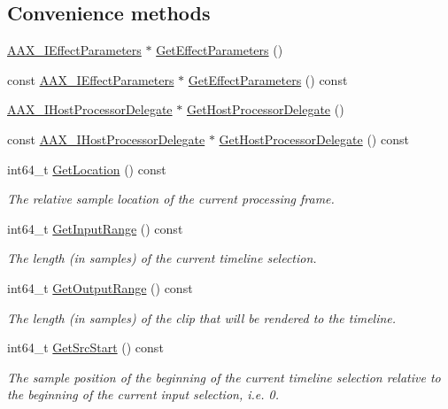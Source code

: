 \subsection*{Convenience methods}
\begin{DoxyCompactItemize}
\item 
\mbox{\hyperlink{a01825}{A\+A\+X\+\_\+\+I\+Effect\+Parameters}} $\ast$ \mbox{\hyperlink{a01485_ac545926ac56fe6788aebda2a905a138f}{Get\+Effect\+Parameters}} ()
\item 
const \mbox{\hyperlink{a01825}{A\+A\+X\+\_\+\+I\+Effect\+Parameters}} $\ast$ \mbox{\hyperlink{a01485_aee036e76c1dd18a874f9327fb3d5d629}{Get\+Effect\+Parameters}} () const
\item 
\mbox{\hyperlink{a01837}{A\+A\+X\+\_\+\+I\+Host\+Processor\+Delegate}} $\ast$ \mbox{\hyperlink{a01485_aff1d956c341d1e06283a1bbb91240ebd}{Get\+Host\+Processor\+Delegate}} ()
\item 
const \mbox{\hyperlink{a01837}{A\+A\+X\+\_\+\+I\+Host\+Processor\+Delegate}} $\ast$ \mbox{\hyperlink{a01485_ab008fdeaecb5d282a0f5bc4166d25dd8}{Get\+Host\+Processor\+Delegate}} () const
\item 
int64\+\_\+t \mbox{\hyperlink{a01485_a8d554bfd981a41e180530bef2ebbf9e3}{Get\+Location}} () const
\begin{DoxyCompactList}\small\item\em The relative sample location of the current processing frame. \end{DoxyCompactList}\item 
int64\+\_\+t \mbox{\hyperlink{a01485_a2b93d94600b7d356bba14e070b8b40a3}{Get\+Input\+Range}} () const
\begin{DoxyCompactList}\small\item\em The length (in samples) of the current timeline selection. \end{DoxyCompactList}\item 
int64\+\_\+t \mbox{\hyperlink{a01485_a921f63ec72c167cb673582ca92f934b6}{Get\+Output\+Range}} () const
\begin{DoxyCompactList}\small\item\em The length (in samples) of the clip that will be rendered to the timeline. \end{DoxyCompactList}\item 
int64\+\_\+t \mbox{\hyperlink{a01485_aec4fa455a4e8ecccc245ce30b596c7b4}{Get\+Src\+Start}} () const
\begin{DoxyCompactList}\small\item\em The sample position of the beginning of the current timeline selection relative to the beginning of the current input selection, i.\+e. 0. \end{DoxyCompactList}\item 

\end{DoxyCompactItemize}

